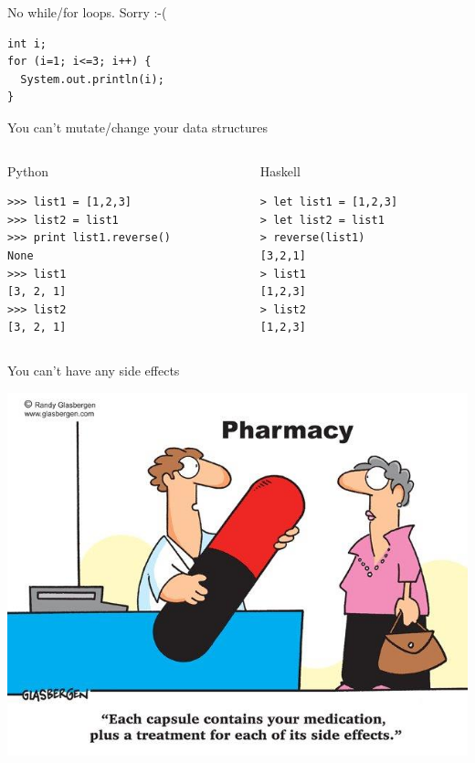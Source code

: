 \documentclass[mathserif]{beamer}
\begin{document}
\begin{frame}[fragile]{No while/for loops. Sorry :-(}
  \begin{verbatim}
int i;
for (i=1; i<=3; i++) {
  System.out.println(i);
}
  \end{verbatim}
\end{frame}

\begin{frame}[fragile]{You can't mutate/change your data structures}
     \begin{columns}[t]
     \begin{column}[T]{5cm}
Python
\begin{verbatim}
>>> list1 = [1,2,3]
>>> list2 = list1
>>> print list1.reverse()
None
>>> list1
[3, 2, 1]
>>> list2
[3, 2, 1]
\end{verbatim}
     \end{column}

     \begin{column}[T]{5cm}
Haskell
\begin{verbatim}
> let list1 = [1,2,3]
> let list2 = list1
> reverse(list1)
[3,2,1]
> list1
[1,2,3]
> list2
[1,2,3]
\end{verbatim}
     \end{column}
     \end{columns}
\end{frame}

\begin{frame}{You can't have any side effects}
  \begin{center}
    \includegraphics[scale=0.4]{img/side-effects-cartoon.jpg}
  \end{center}
\end{frame}
\end{document}
